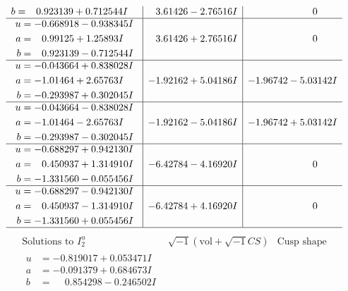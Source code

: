 \documentclass[1p]{elsarticle_modified}
\theoremstyle{definition}
\newcommand{\I}{\sqrt{-1}}
\begin{document}
$$\begin{array}{c|c|c}
\begin{aligned}
b &= \phantom{-}0.923139 + 0.712544 I\end{aligned}
 & \phantom{-}3.61426 - 2.76516 I & \phantom{-0.000000 } 0 \\ \hline\begin{aligned}
u &= -0.668918 - 0.938345 I \\
a &= \phantom{-}0.99125 + 1.25893 I \\
b &= \phantom{-}0.923139 - 0.712544 I\end{aligned}
 & \phantom{-}3.61426 + 2.76516 I & \phantom{-0.000000 } 0 \\ \hline\begin{aligned}
u &= -0.043664 + 0.838028 I \\
a &= -1.01464 + 2.65763 I \\
b &= -0.293987 + 0.302045 I\end{aligned}
 & -1.92162 + 5.04186 I & -1.96742 - 5.03142 I \\ \hline\begin{aligned}
u &= -0.043664 - 0.838028 I \\
a &= -1.01464 - 2.65763 I \\
b &= -0.293987 - 0.302045 I\end{aligned}
 & -1.92162 - 5.04186 I & -1.96742 + 5.03142 I \\ \hline\begin{aligned}
u &= -0.688297 + 0.942130 I \\
a &= \phantom{-}0.450937 + 1.314910 I \\
b &= -1.331560 - 0.055456 I\end{aligned}
 & -6.42784 - 4.16920 I & \phantom{-0.000000 } 0 \\ \hline\begin{aligned}
u &= -0.688297 - 0.942130 I \\
a &= \phantom{-}0.450937 - 1.314910 I \\
b &= -1.331560 + 0.055456 I\end{aligned}
 & -6.42784 + 4.16920 I & \phantom{-0.000000 } 0\\
 \hline 
 \end{array}$$\newpage$$\begin{array}{c|c|c}  
\text{Solutions to }I^u_{2}& \I (\text{vol} + \sqrt{-1}CS) & \text{Cusp shape}\\
 \hline 
\begin{aligned}
u &= -0.819017 + 0.053471 I \\
a &= -0.091379 + 0.684673 I \\
b &= \phantom{-}0.854298 - 0.246502 I\end{aligned}

\end{array}$$
\end{document}
